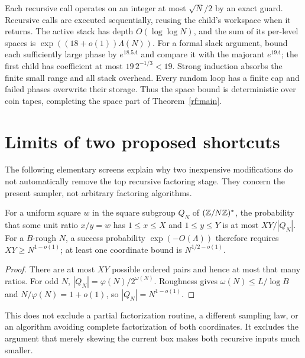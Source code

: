 Each recursive call operates on an integer at most $\sqrt N/2$
by an exact guard.  Recursive calls are executed sequentially,
reusing the child's workspace when it returns.  The active
stack has depth $O(\log\log N)$, and the sum of its per-level
spaces is $\exp((18+o(1))\Lambda(N))$.
For a formal slack argument, bound each sufficiently large
phase by $e^{18.5\Lambda}$ and compare it with the majorant
$e^{19\Lambda}$; the first child has coefficient at most
$19\,2^{-1/3}<19$.  Strong induction absorbs the finite small
range and all stack overhead.
Every random loop has a finite cap and failed phases overwrite
their storage.  Thus the space bound is deterministic over coin
tapes, completing the space part of Theorem~\ref{rf:main}.

\section{Limits of two proposed shortcuts}
\label{rf:shortcuts}

The following elementary screens explain why two inexpensive
modifications do not automatically remove the top recursive
factoring stage.  They concern the present sampler, not arbitrary
factoring algorithms.

\begin{proposition}
For a uniform square $w$ in the square subgroup $Q_N$ of
$(\mathbb Z/N\mathbb Z)^*$, the probability that some unit ratio $x/y=w$
has $1\le x\le X$ and $1\le y\le Y$ is at most $XY/|Q_N|$.
For a $B$-rough $N$, a success probability
$\exp(-O(\Lambda))$ therefore requires
$XY\ge N^{1-o(1)}$; at least one coordinate bound is
$N^{1/2-o(1)}$.
\end{proposition}
\begin{proof}
There are at most $XY$ possible ordered pairs and hence at most
that many ratios.  For odd $N$,
$|Q_N|=\varphi(N)/2^{\omega(N)}$.
Roughness gives $\omega(N)\le L/\log B$ and
$N/\varphi(N)=1+o(1)$, so $|Q_N|=N^{1-o(1)}$.
\end{proof}

This does not exclude a partial factorization routine, a different
sampling law, or an algorithm avoiding complete factorization
of both coordinates.  It excludes the argument that merely
skewing the current box makes both recursive inputs much smaller.

